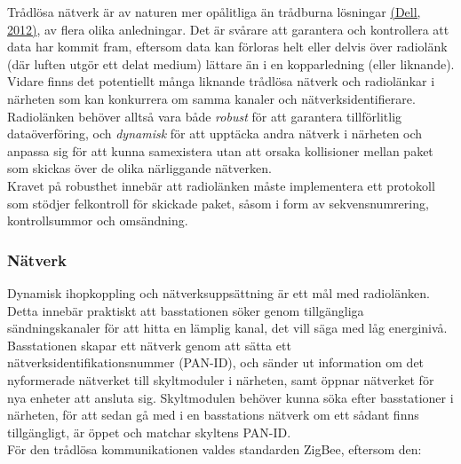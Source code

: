 \documentclass[a4paper,11pt]{article}
\begin{document}
Trådlösa nätverk är av naturen mer opålitliga än trådburna lösningar \hyperref[dell]{(Dell, 2012)}, av flera olika anledningar. Det är svårare att garantera och kontrollera att data har kommit fram, eftersom data kan förloras helt eller delvis över radiolänk (där luften utgör ett delat medium) lättare än i en kopparledning (eller liknande). Vidare finns det potentiellt många liknande trådlösa nätverk och radiolänkar i närheten som kan konkurrera om samma kanaler och nätverksidentifierare. Radiolänken behöver alltså vara både {\it robust} för att garantera tillförlitlig dataöverföring, och {\it dynamisk} för att upptäcka andra nätverk i närheten och anpassa sig för att kunna samexistera utan att orsaka kollisioner mellan paket som skickas över de olika närliggande nätverken. \\

Kravet på robusthet innebär att radiolänken måste implementera ett protokoll som stödjer felkontroll för skickade paket, såsom i form av sekvensnumrering, kontrollsummor och omsändning.

\subsubsection{Nätverk}
Dynamisk ihopkoppling och nätverksuppsättning är ett mål med radiolänken. Detta innebär praktiskt att basstationen söker genom tillgängliga sändningskanaler för att hitta en lämplig kanal, det vill säga med låg energinivå. Basstationen skapar ett nätverk genom att sätta ett nätverksidentifikationsnummer (PAN-ID), och sänder ut information om det nyformerade nätverket till skyltmoduler i närheten, samt öppnar nätverket för nya enheter att ansluta sig. Skyltmodulen behöver kunna söka efter basstationer i närheten, för att sedan gå med i en basstations nätverk om ett sådant finns tillgängligt, är öppet och matchar skyltens PAN-ID. \\

För den trådlösa kommunikationen valdes standarden ZigBee, eftersom den:
	
\end{document}
